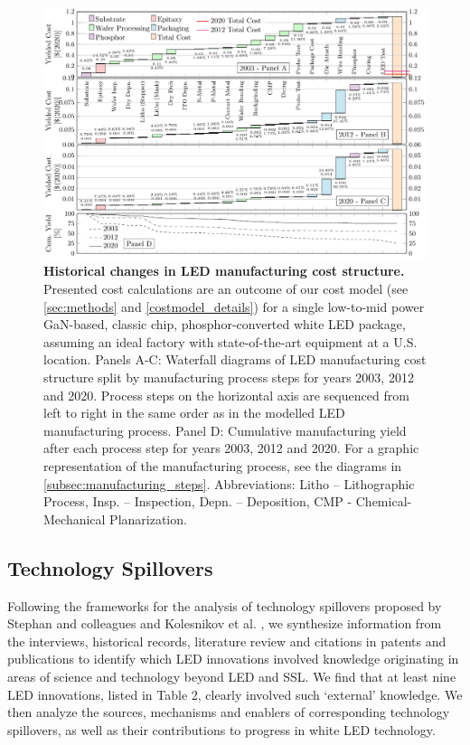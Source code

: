 \documentclass[parskip=full]{article}
\begin{document}
\begin{figure}[h!]
 \centering
 \includegraphics[width=17.5cm]{figures/costmodel_results_years.pdf}
 \caption{\textbf{Historical changes in LED manufacturing cost structure.} Presented cost calculations are an outcome of our cost model (see \cref{sec:methods} and \cref{costmodel_details}) for a single low-to-mid power GaN-based, classic chip, phosphor-converted white LED package, assuming an ideal factory with state-of-the-art equipment at a U.S. location. Panels A-C: Waterfall diagrams of LED manufacturing cost structure split by manufacturing process steps for years 2003, 2012 and 2020. Process steps on the horizontal axis are sequenced from left to right in the same order as in the modelled LED manufacturing process. Panel D: Cumulative manufacturing yield after each process step for years 2003, 2012 and 2020. For a graphic representation of the manufacturing process, see the diagrams in \cref{subsec:manufacturing_steps}. Abbreviations: Litho – Lithographic Process, Insp. – Inspection, Depn. – Deposition, CMP - Chemical-Mechanical Planarization.}
 \label{fgr:costmodel}
\end{figure}

\subsection{Technology Spillovers}

Following the frameworks for the analysis of technology spillovers proposed by Stephan and colleagues \cite{Stephan2021} and Kolesnikov et al. \cite{kolesnikov2022technology}, we synthesize information from the interviews, historical records, literature review and citations in patents and publications to identify which LED innovations involved knowledge originating in areas of science and technology beyond LED and SSL. We find that at least nine LED innovations, listed in Table 2, clearly involved such ‘external’ knowledge. We then analyze the sources, mechanisms and enablers of corresponding technology spillovers, as well as their contributions to progress in white LED technology. 
\end{document}
